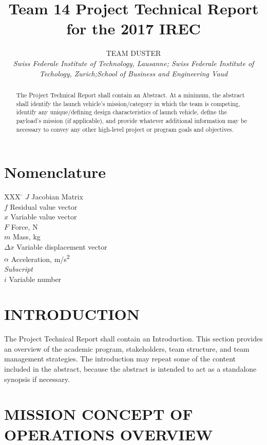 \documentclass[]{aiaa-tc}%
\title{Team 14 Project Technical Report for the 2017 IREC}
\author{
  TEAM DUSTER%
  \\
  {\normalsize\itshape
   Swiss Federale Institute of Technology, Lausanne;
   Swiss Federale Institute of Techology, Zurich;School of Business and Engineering Vaud}
 }
\begin{document}
\maketitle

\begin{abstract}


The Project Technical Report shall contain an Abstract. At a minimum, the abstract shall identify the launch vehicle's mission/category in which the team is competing, identify any unique/defining design characteristics of launch vehicle, define the payload's mission (if applicable), and provide whatever additional information may be necessary to convey any other high-level project or program goals and objectives.


\end{abstract}

\section*{Nomenclature}

\begin{tabbing}
  XXX \= \kill%
  $J$ \> Jacobian Matrix \\
  $f$ \> Residual value vector \\
  $x$ \> Variable value vector \\
  $F$ \> Force, N \\
  $m$ \> Mass, kg \\
  $\Delta x$ \> Variable displacement vector \\
  $\alpha$ \> Acceleration, m/s\textsuperscript{2} \\[5pt]
  \textit{Subscript}\\
  $i$ \> Variable number \\
 \end{tabbing}

\section{INTRODUCTION}


The Project Technical Report shall contain an Introduction. This section provides an overview of the academic program, stakeholders, team structure, and team management strategies. The introduction may repeat some of the content included in the abstract, because the abstract is intended to act as a standalone synopsis if necessary.


\section{MISSION CONCEPT OF OPERATIONS OVERVIEW}
\end{document}
